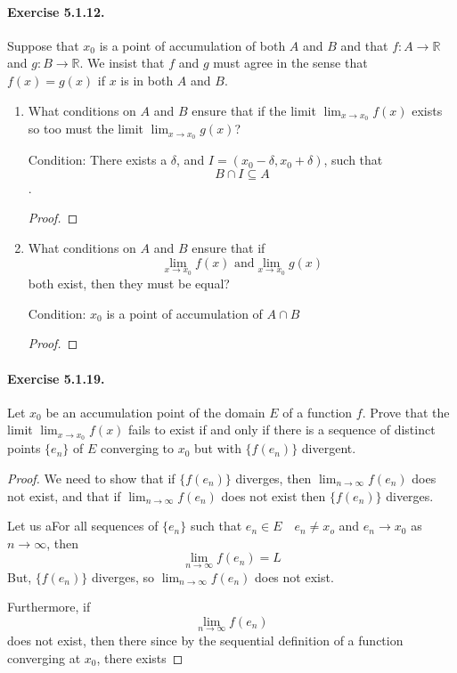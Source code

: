 \documentclass[11pt]{article}
\def \R {\mathbb{R}}
\newcommand{\set}[1]{\{#1\}}
\def \limittoinfyn {\lim_{n \to \infty}}
\def \en {e_n}
\begin{document}
\paragraph{Exercise 5.1.12.} Suppose that $x_0$ is a point of accumulation of both $A$ and $B$ and that $f:A \to \R$ and $g:B \to \R$.
We insist that $f$ and $g$ must agree in the sense that $f(x) = g(x)$ if $x$ is in both $A$ and $B$.
\begin{enumerate}[label=(\alph*)]
	\item What conditions on $A$ and $B$ ensure that if the limit $\lim_{x \rightarrow x_0} f(x)$ exists so too must the limit $\lim_{x \rightarrow x_0} g(x)$?

	Condition: There exists a $ \delta $, and $ I = (x_0 - \delta, x_0 + \delta) $, such that $$ B \cap I \subseteq A $$.
	
	\begin{proof}
	\end{proof}

	\item What conditions on $A$ and $B$ ensure that if
    \[ \lim_{x \rightarrow x_0} f(x) \text{ and} \lim_{x \rightarrow x_0} g(x) \]
    both exist, then they must be equal?

	Condition: $ x_0 $ is a point of accumulation of $ A \cap B $
	\begin{proof}
	\end{proof}

\end{enumerate}

\paragraph{Exercise 5.1.19.} Let $x_0$ be an accumulation point of the domain $E$ of a function $f$.
Prove that the limit $\lim_{x \rightarrow x_0} f(x)$ fails to exist if and only if there is a sequence of distinct points $\{e_n\}$ of $E$ converging to $x_0$ but with $ \set{ f(\en) } $ divergent.

\begin{proof}
	
	We need to show that if $ \set{ f(\en)} $ diverges, then $\limittoinfyn f(\en)$ does not exist, and that if $\limittoinfyn f(\en)$ does not exist then $ \set{ f(\en)} $ diverges.
	
	
	Let us aFor all sequences of $ \set{\en} $ such that $ \en \in E \quad \en \ne x_o $ and $ \en \to x_0 $ as $ n \to \infty $, then 
		$$ \limittoinfyn f(\en) = L$$
	But, $ \set{f(\en)} $ diverges, so $\limittoinfyn f(\en)$ does not exist.
	

	Furthermore, if $$ \limittoinfyn f(\en) $$ does not exist, then there  since by the sequential definition of a function converging at $ x_0 $, there exists 
	

\end{proof}
\end{document}
